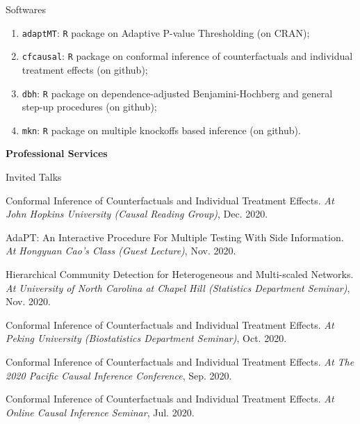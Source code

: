 \documentclass{article}
\begin{document}
\begin{large}
\noindent Softwares 
\end{large}

\begin{enumerate}
\item \texttt{adaptMT}: \texttt{R} package on Adaptive P-value Thresholding (on CRAN);
\item \texttt{cfcausal}: \texttt{R} package on conformal inference of counterfactuals and individual treatment effects (on github);
\item \texttt{dbh}: \texttt{R} package on dependence-adjusted Benjamini-Hochberg and general step-up procedures (on github);
\item \texttt{mkn}: \texttt{R} package on multiple knockoffs based inference (on github).
\end{enumerate}

\vspace{2mm}
\begin{large}
\noindent \textbf{Professional Services}
\end{large}
\vspace{5mm}

\begin{large}
\noindent Invited Talks
\end{large}

\vspace{2mm}
Conformal Inference of Counterfactuals and Individual Treatment Effects. \emph{At John Hopkins University (Causal Reading Group)}, Dec. 2020.

\vspace{2mm}
AdaPT: An Interactive Procedure For Multiple Testing With Side Information. \emph{At Hongyuan Cao's Class (Guest Lecture)}, Nov. 2020. 

\vspace{2mm}
Hierarchical Community Detection for Heterogeneous and Multi-scaled Networks. \emph{At University of North Carolina at Chapel Hill (Statistics Department Seminar)}, Nov. 2020. 

\vspace{2mm}
Conformal Inference of Counterfactuals and Individual Treatment Effects. \emph{At Peking University (Biostatistics Department Seminar)}, Oct. 2020.

\vspace{2mm}
Conformal Inference of Counterfactuals and Individual Treatment Effects. \emph{At The 2020 Pacific Causal Inference Conference}, Sep. 2020.

\vspace{2mm}
Conformal Inference of Counterfactuals and Individual Treatment Effects. \emph{At Online Causal Inference Seminar}, Jul. 2020.
\end{document}
